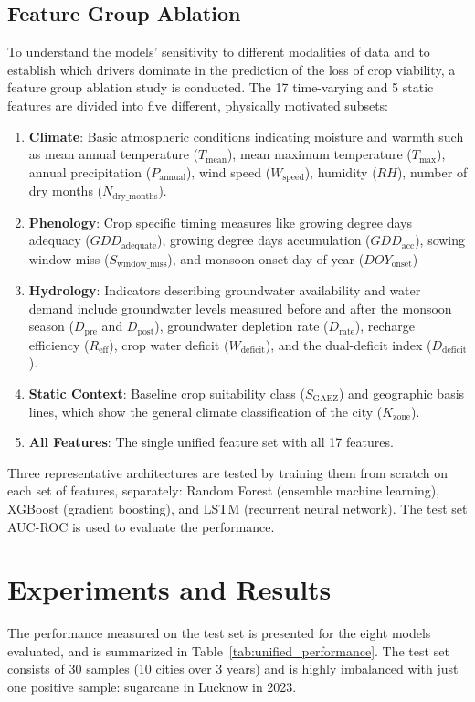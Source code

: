 \documentclass{ieeeaccess}
\begin{document}
\subsection{Feature Group Ablation}
To understand the models' sensitivity to different modalities of data and to establish which drivers dominate in the prediction of the loss of crop viability, a feature group ablation study is conducted. The 17 time-varying and 5 static features are divided into five different, physically motivated subsets:
\begin{enumerate}
    \item \textbf{Climate}: Basic atmospheric conditions indicating moisture and warmth such as mean annual temperature ($T_{\text{mean}}$), mean maximum temperature ($T_{\text{max}}$), annual precipitation ($P_{\text{annual}}$), wind speed ($W_{\text{speed}}$), humidity ($RH$), number of dry months ($N_{\text{dry\_months}}$).
    \item \textbf{Phenology}: Crop specific timing measures like growing degree days adequacy ($GDD_{\text{adequate}}$), growing degree days accumulation ($GDD_{\text{acc}}$), sowing window miss ($S_{\text{window\_miss}}$), and monsoon onset day of year ($DOY_{\text{onset}}$)
    \item \textbf{Hydrology}: Indicators describing groundwater availability and water demand include groundwater levels measured before and after the monsoon season ($D_{\text{pre}}$ and $D_{\text{post}}$), groundwater depletion rate ($D_{\text{rate}}$), recharge efficiency ($R_{\text{eff}}$), crop water deficit ($W_{\text{deficit}}$), and the dual-deficit index ($D_{\text{deficit}}$).
    \item \textbf{Static Context}: Baseline crop suitability class ($S_{\text{GAEZ}}$) and geographic basis lines, which show the general climate classification of the city ($K_{\text{zone}}$).
    \item \textbf{All Features}: The single unified feature set with all 17 features.
\end{enumerate}

Three representative architectures are tested by training them from scratch on each set of features, separately: Random Forest (ensemble machine learning), XGBoost (gradient boosting), and LSTM (recurrent neural network). The test set AUC-ROC is used to evaluate the performance.

\section{Experiments and Results}
\label{sec:results}
The performance measured on the test set is presented for the eight models evaluated, and is summarized in Table~\ref{tab:unified_performance}. The test set consists of 30 samples (10 cities over 3 years) and is highly imbalanced with just one positive sample: sugarcane in Lucknow in 2023. 
\end{document}
